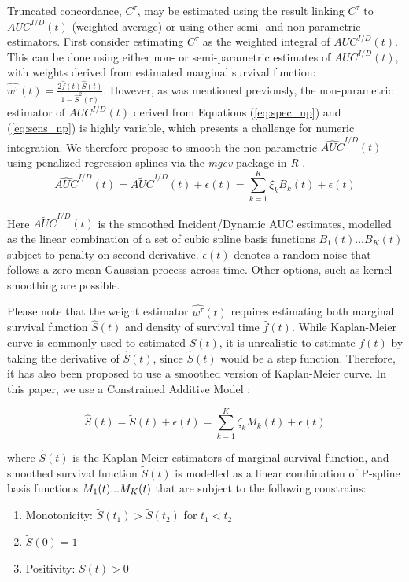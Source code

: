 \documentclass[useAMS,usenatbib, referee]{biom}
\begin{document}
Truncated concordance, $C^{\tau}$, may be estimated using the result linking $C^{\tau}$ to $AUC^{I/D}(t)$ (weighted average) or using other semi- and non-parametric estimators. First consider estimating $C^{\tau}$ as the weighted integral of $AUC^{I/D}(t)$. This can be done using either non- or semi-parametric estimates of $AUC^{I/D}(t)$, with weights derived from estimated marginal survival function: $\hat{w^{\tau}}(t) = \frac{2\hat{f}(t)\hat{S}(t)}{1-\hat{S}^2(\tau)}$. However, as was mentioned previously, the non-parametric estimator of $AUC^{I/D}(t)$ derived from Equations (\ref{eq:spec_np}) and (\ref{eq:sens_np}) is highly variable, which presents a challenge for numeric integration. We therefore propose to smooth the non-parametric $\hat{AUC}^{I/D}(t)$ using penalized regression splines via the \textit{mgcv} package \citep{wood2003, wood2011, wood2017} in \textit{R} \citep{Rsoftware}.
\[
    \hat{AUC}^{I/D}(t) = 
    \tilde{AUC}^{I/D}(t) + \epsilon(t) =
    \sum_{k=1}^K \xi_k B_k(t) + \epsilon(t)
\]

Here $\tilde{AUC}^{I/D}(t)$ is the smoothed Incident/Dynamic AUC estimates, modelled as the linear combination of a set of cubic spline basis functions $B_1(t)...B_K(t)$ subject to penalty on second derivative. $\epsilon(t)$ denotes a random noise that follows a zero-mean Gaussian process across time. Other options, such as kernel smoothing \citep{VANGELOVEN2021107095} are possible. 

Please note that the weight estimator $\hat{w^{\tau}}(t)$ requires estimating both marginal survival function $\hat{S}(t)$ and density of survival time $\hat{f}(t)$. While Kaplan-Meier curve is commonly used to estimated $S(t)$, it is unrealistic to estimate $f(t)$ by taking the derivative of $\hat{S}(t)$, since $\hat{S}(t)$ would be a step function. Therefore, it has also been proposed to use a smoothed version of Kaplan-Meier curve. In this paper, we use a Constrained Additive Model \citep{pya2021}: 

\[
\hat{S}(t) = \tilde{S}(t) + \epsilon(t)
    = \sum_{k=1}^K \zeta_k M_k(t) + \epsilon(t)
\]

where $\hat{S}(t)$ is the Kaplan-Meier estimators of marginal survival function, and smoothed survival function $\tilde{S}(t)$ is modelled as a linear combination of P-spline basis functions $M_1(t)...\\M_K(t)$ that are subject to the following constrains:
\begin{enumerate}
    \setlength\itemsep{0em}
    \item Monotonicity: $\tilde{S}(t_1) > \tilde{S}(t_2)$ for $t_1 < t_2$
    \item $\tilde{S}(0) = 1$
    \item Positivity: $\tilde{S}(t) > 0$
\end{enumerate}
\end{document}
